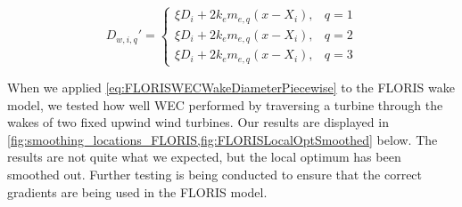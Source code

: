 \documentclass[a4paper]{jpconf}
\begin{document}
\begin{equation}
    D_{w, i, q}' = \begin{cases}
        \xi D_i + 2k_em_{e, q} (x - X_i), & q = 1 \\
        \xi D_i + 2k_em_{e, q} (x - X_i), & q = 2 \\
        \xi D_i + 2k_em_{e, q} (x - X_i), & q = 3
    \end{cases}
    \label{eq:FLORISWECWakeDiameterPiecewise}
\end{equation}

When we applied \cref{eq:FLORISWECWakeDiameterPiecewise} to the FLORIS wake model, we tested how well WEC performed by traversing a turbine through the wakes of two fixed upwind wind turbines. Our results are displayed in \cref{fig:smoothing_locations_FLORIS,fig:FLORISLocalOptSmoothed} below. The results are not quite what we expected, but the local optimum has been smoothed out. Further testing is being conducted to ensure that the correct gradients are being used in the FLORIS model.
\end{document}
